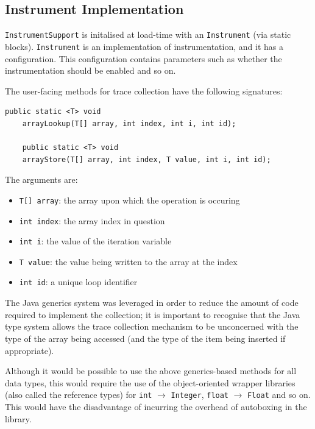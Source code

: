 	\subsection{Instrument Implementation} \label{sec:runtime/implementation/instrument}
	\texttt{InstrumentSupport} is initalised at load-time with an \texttt{Instrument} (via static blocks). \texttt{Instrument} is an implementation of instrumentation, and it has a configuration. This configuration contains parameters such as whether the instrumentation should be enabled and so on.
	
	The user-facing methods for trace collection have the following signatures:
	
	\begin{lstlisting}[caption=Method signatures for instrumentation methods,label=lst:sigs]
	public static <T> void
	arrayLookup(T[] array, int index, int i, int id);
	
	public static <T> void
	arrayStore(T[] array, int index, T value, int i, int id);\end{lstlisting}
	
	The arguments are:
	
	\begin{itemize} \label{items:trace-args}
		\item \texttt{T[] array}: the array upon which the operation is occuring
		\item \texttt{int index}: the array index in question
		\item \texttt{int i}: the value of the iteration variable
		\item \texttt{T value}: the value being written to the array at the index
		\item \texttt{int id}: a unique loop identifier
	\end{itemize}
	
	The Java generics system was leveraged in order to reduce the amount of code required to implement the collection; it is important to recognise that the Java type system allows the trace collection mechanism to be unconcerned with the type of the array being accessed (and the type of the item being inserted if appropriate).
	
	Although it would be possible to use the above generics-based methods for all data types, this would require the use of the object-oriented wrapper libraries (also called the reference types) for \texttt{int} $\rightarrow$ \texttt{Integer}, \texttt{float} $\rightarrow$ \texttt{Float} and so on. This would have the disadvantage of incurring the overhead of autoboxing \citep{boxing} in the library.
	
